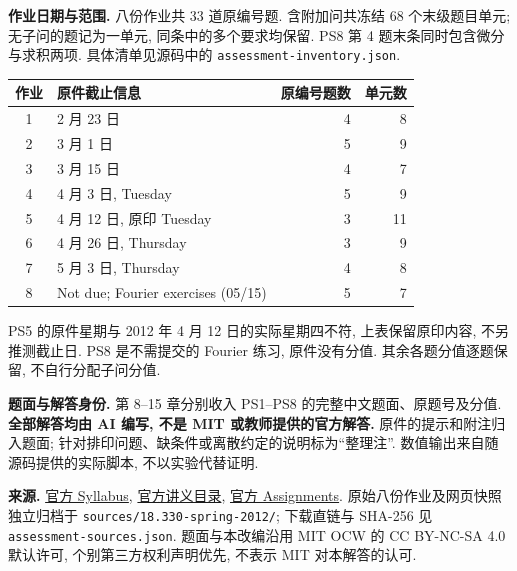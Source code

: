 \textbf{作业日期与范围.} 八份作业共 33 道原编号题. 含附加问共冻结 68 个末级题目单元; 无子问的题记为一单元, 同条中的多个要求均保留. PS8 第 4 题末条同时包含微分与求积两项. 具体清单见源码中的 \nolinkurl{assessment-inventory.json}.
\begin{center}
\begin{tabular}{clrr}
\toprule
作业 & 原件截止信息 & 原编号题数 & 单元数 \\
\midrule
1 & 2 月 23 日 & 4 & 8 \\
2 & 3 月 1 日 & 5 & 9 \\
3 & 3 月 15 日 & 4 & 7 \\
4 & 4 月 3 日, Tuesday & 5 & 9 \\
5 & 4 月 12 日, 原印 Tuesday & 3 & 11 \\
6 & 4 月 26 日, Thursday & 3 & 9 \\
7 & 5 月 3 日, Thursday & 4 & 8 \\
8 & Not due; Fourier exercises (05/15) & 5 & 7 \\
\bottomrule
\end{tabular}
\end{center}
PS5 的原件星期与 2012 年 4 月 12 日的实际星期四不符, 上表保留原印内容, 不另推测截止日. PS8 是不需提交的 Fourier 练习, 原件没有分值. 其余各题分值逐题保留, 不自行分配子问分值.

\textbf{题面与解答身份.} 第 8--15 章分别收入 PS1--PS8 的完整中文题面、原题号及分值. \textbf{全部解答均由 AI 编写, 不是 MIT 或教师提供的官方解答.} 原件的提示和附注归入题面; 针对排印问题、缺条件或离散约定的说明标为“整理注”. 数值输出来自随源码提供的实际脚本, 不以实验代替证明.

\textbf{来源.} \href{https://ocw.mit.edu/courses/18-330-introduction-to-numerical-analysis-spring-2012/pages/syllabus/}{官方 Syllabus}, \href{https://ocw.mit.edu/courses/18-330-introduction-to-numerical-analysis-spring-2012/pages/lecture-notes/}{官方讲义目录}, \href{https://ocw.mit.edu/courses/18-330-introduction-to-numerical-analysis-spring-2012/pages/assignments/}{官方 Assignments}. 原始八份作业及网页快照独立归档于 \nolinkurl{sources/18.330-spring-2012/}; 下载直链与 SHA-256 见 \nolinkurl{assessment-sources.json}. 题面与本改编沿用 MIT OCW 的 CC BY-NC-SA 4.0 默认许可, 个别第三方权利声明优先, 不表示 MIT 对本解答的认可.
